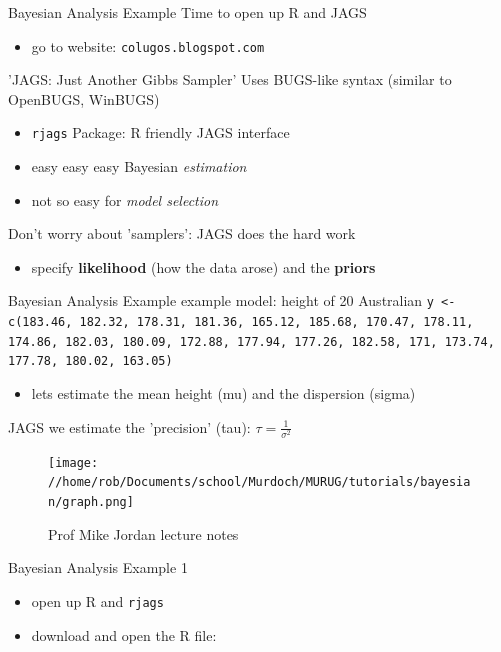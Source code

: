 \documentclass[presentation,9pt,xcolor=dvipsnames]{beamer}
\begin{document}
\begin{frame}[fragile,label={sec:org3c61d88}]{Bayesian Analysis Example}
 Time to open up R and JAGS
\begin{itemize}
\item go to website: \texttt{colugos.blogspot.com}
\end{itemize}
\begin{block}{'JAGS: Just Another Gibbs Sampler'}
Uses BUGS-like syntax (similar to OpenBUGS, WinBUGS)
\begin{itemize}
\item \texttt{rjags} Package: R friendly JAGS interface
\item easy easy \alert{easy} Bayesian \emph{estimation}
\item not so easy for \emph{model selection}
\end{itemize}
Don't worry about 'samplers': JAGS does the hard work
\begin{itemize}
\item specify \textbf{likelihood} (how the data arose) and the \textbf{priors}
\end{itemize}
\end{block}
\end{frame}
\begin{frame}[fragile,label={sec:org00d4c0c}]{Bayesian Analysis Example}
 example model: height of 20 Australian
\color{blue}
\texttt{y <- c(183.46, 182.32, 178.31, 181.36, 165.12, 185.68, 170.47, 178.11, 174.86, 182.03, 180.09, 172.88, 177.94, 177.26, 182.58, 171, 173.74, 177.78, 180.02, 163.05)}
\color{black}
\begin{itemize}
\item lets estimate the mean height (mu) and the dispersion (sigma)
\end{itemize}
\begin{small}
JAGS we estimate the 'precision' (tau): $\tau=\frac{1}{\sigma^2}$
\end{small}
\begin{figure}[htbp]

\texttt{[image: //home/rob/Documents/school/Murdoch/MURUG/tutorials/bayesian/graph.png]}
\caption{Prof Mike Jordan lecture notes}
\end{figure}
\end{frame}

\begin{frame}[fragile,label={sec:orgae2e357}]{Bayesian Analysis Example 1}
 \begin{itemize}
\item open up R and \texttt{rjags}
\item download and open the R file:
\end{itemize}
\end{frame}
\end{document}
